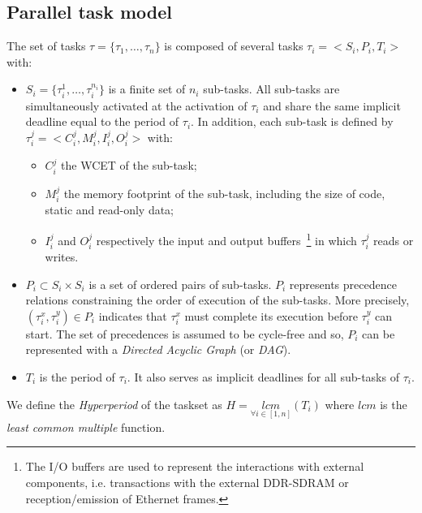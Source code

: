 \documentclass[main.tex]{subfiles}
\begin{document}
\subsection{Parallel task model}
The set of tasks $\tau = \{ \tau_1 , \ldots , \tau_n \}$ is composed of several
tasks $\tau_i = < S_i , P_i , T_i >$ with:
\begin{itemize}
    \item $S_i = \{ \tau_i^1 , \ldots , \tau_i^{n_i} \}$ is a finite set of
        $n_i$ sub-tasks. All sub-tasks are simultaneously activated at the
        activation of $\tau_i$ and share the same implicit deadline equal to
        the period of $\tau_i$. In addition, each sub-task is defined by
        $\tau_i^j = < C_i^j , M_i^j , I_i^j , O_i^j >$ with:
        \begin{itemize}
            \item $C_i^j$ the WCET of the sub-task;
            \item $M_i^j$ the memory footprint of the sub-task, including the
                size of code, static and read-only data;
            \item $I_i^j$ and $O_i^j$ respectively the input and output
                buffers~\footnote{The I/O buffers are used to represent the
                interactions with external components, i.e. transactions with
                the external DDR-SDRAM or reception/emission of Ethernet
                frames.} in which $\tau_i^j$ reads or writes.
        \end{itemize}
    \item $P_i \subset S_i \times S_i$ is a set of ordered pairs of sub-tasks.
        $P_i$ represents precedence relations constraining the order of
        execution of the sub-tasks. More precisely, $(\tau_i^x , \tau_i^y) \in
        P_i$ indicates that $\tau_i^x$ must complete its execution before
        $\tau_i^y$ can start. The set of precedences is assumed to be
        cycle-free and so, $P_i$ can be represented with a \emph{Directed
        Acyclic Graph} (or \emph{DAG}).
    \item $T_i$ is the period of $\tau_i$. It also serves as implicit deadlines
        for all sub-tasks of $\tau_i$.
\end{itemize}

We define the \emph{Hyperperiod} of the taskset as $H = \underset{\forall i \in
[1 , n]}{lcm} ( T_i )$ where $lcm$ is the \emph{least common multiple}
function.
\end{document}

